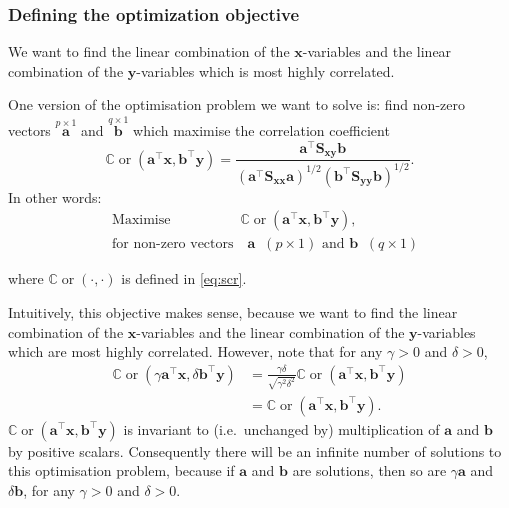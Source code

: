 \documentclass[
]{book}
\theoremstyle{definition}
\theoremstyle{definition}
\theoremstyle{definition}
\theoremstyle{definition}
\theoremstyle{remark}
\begin{document}
\hypertarget{defining-the-optimization-objective}{%
\subsubsection*{Defining the optimization objective}\label{defining-the-optimization-objective}}

We want to find the linear combination of the \(\mathbf x\)-variables and the linear combination of the \(\mathbf y\)-variables which is most highly correlated.

One version of the optimisation problem we want to solve is: find non-zero vectors \(\stackrel{p \times 1}{\mathbf a}\) and \(\stackrel{q \times 1}{\mathbf b}\) which maximise the correlation coefficient
\[
{\mathbb{C}\operatorname{or}}(\mathbf a^\top \mathbf x,\mathbf b^\top \mathbf y)=\frac{\mathbf a^\top \mathbf S_{\mathbf x\mathbf y}\mathbf b}{(\mathbf a^\top \mathbf S_{\mathbf x\mathbf x}\mathbf a)^{1/2}(\mathbf b^\top \mathbf S_{\mathbf y\mathbf y}\mathbf b)^{1/2}}.
\]
In other words:
\begin{align}
&\mbox{Maximise} \qquad\qquad \quad  {\mathbb{C}\operatorname{or}}(\mathbf a^\top \mathbf x,\mathbf b^\top \mathbf y),
\label{eq:opt26}\\
  &\mbox{for non-zero vectors}\quad  \mathbf a\;\; (p \times 1)\mbox{ and  } \mathbf b\;\; (q \times 1) \nonumber
\end{align}

where \({\mathbb{C}\operatorname{or}}(\cdot,\cdot)\) is defined in \eqref{eq:scr}.

Intuitively, this objective makes sense, because we want to find the linear combination of the \(\mathbf x\)-variables and the linear combination of the \(\mathbf y\)-variables which are most highly correlated.
However, note that for any \(\gamma>0\) and \(\delta>0\),
\begin{align}
  {\mathbb{C}\operatorname{or}}(\gamma\mathbf a^\top \mathbf x, \delta \mathbf b^\top \mathbf y)&= \frac{\gamma \delta}{\sqrt{\gamma^2 \delta^2}}{\mathbb{C}\operatorname{or}}(\mathbf a^\top \mathbf x,\mathbf b^\top \mathbf y)\\
  &={\mathbb{C}\operatorname{or}}(\mathbf a^\top \mathbf x,\mathbf b^\top \mathbf y).
  \label{eq:invar}
  \end{align}
\({\mathbb{C}\operatorname{or}}(\mathbf a^\top \mathbf x,\mathbf b^\top \mathbf y)\) is invariant to (i.e.~unchanged by) multiplication of \(\mathbf a\) and \(\mathbf b\) by positive scalars. Consequently there will be an infinite number of solutions to this optimisation problem, because if \(\mathbf a\) and \(\mathbf b\) are solutions, then so are \(\gamma \mathbf a\) and \(\delta \mathbf b\), for any \(\gamma>0\) and \(\delta>0\).
\end{document}
